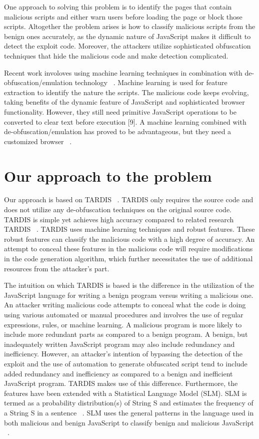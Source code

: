 One approach to solving this problem is to identify the pages that contain malicious scripts and either warn users before loading the page or block those scripts. Altogether the problem arises is how to classify malicious scripts from the benign ones accurately, as the dynamic nature of JavaScript makes it difficult to detect the exploit code. Moreover, the attackers utilize sophisticated obfuscation techniques that hide the malicious code and make detection complicated.

Recent work involoves using machine learning techniques in combination with de-obfuscation/emulation technology ~\cite{g1}. Machine learning is used for feature extraction to identify the nature the scripts. The malicious code keeps evolving, taking benefits of the dynamic feature of JavaScript and sophisticated browser functionality. However, they still need primitive JavaScript operations to be converted to clear text before execution [9]. A machine learning combined with de-obfuscation/emulation has proved to be advantageous, but they need a customized browser ~\cite{g1}.
 
 
\section{Our approach to the problem}

Our approach is based on TARDIS ~\cite{g1}. TARDIS only requires the source code and does not utilize any de-obfuscation techniques on the original source code. TARDIS is simple yet achieves high accuracy compared to related research TARDIS ~\cite{g1}. TARDIS uses machine learning techniques and robust features. These robust features can classify the malicious code with a high degree of accuracy. An attempt to conceal these features in the malicious code will require modifications in the code generation algorithm, which further necessitates the use of additional resources from the attacker's part.

The intuition on which TARDIS is based is the difference in the utilization of the JavaScript language for writing a benign program versus writing a malicious one. An attacker writing malicious code attempts to conceal what the code is doing using various automated or manual procedures and involves the use of regular expressions, rules, or machine learning. A malicious program is more likely to include more redundant parts as compared to a benign program. A benign, but inadequately written JavaScript program may also include redundancy and inefficiency. However, an attacker's intention of bypassing the detection of the exploit and the use of automation to generate obfuscated script tend to include added redundancy and inefficiency as compared to a benign and inefficient JavaScript program. TARDIS makes use of this difference. Furthermore, the features have been extended with a Statistical Language Model (SLM). SLM is termed as a probability distribution(s) of String S and estimates the frequency of a String S in a sentence ~\cite{g11}. SLM uses the general patterns in the language used in both malicious and benign JavaScript to classify benign and malicious JavaScript ~\cite{g1}.

